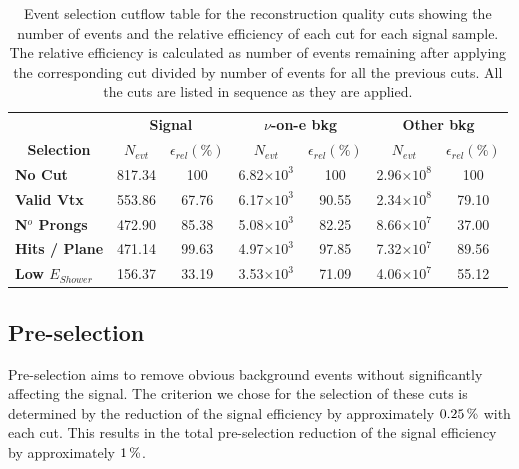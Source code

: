 \begin{table}[!hb]
\centering
\caption[Event selection cutflow table for the reconstruction quality cuts]{Event selection cutflow table for the reconstruction quality cuts showing the number of events and the relative efficiency of each cut for each signal sample. The relative efficiency is calculated as number of events remaining after applying the corresponding cut divided by number of events for all the previous cuts. All the cuts are listed in sequence as they are applied.}
\begin{tabular}{|l|cc|cc|cc|}\hline
\multicolumn{1}{|c|}{} & \multicolumn{2}{c|}{\textbf{Signal}} & \multicolumn{2}{c|}{\textbf{$\nu$-on-e bkg}} & \multicolumn{2}{c|}{\textbf{Other bkg}} \\
\multicolumn{1}{|c|}{\multirow{-2}{*}{\textbf{Selection}}} & \textbf{$N_{evt}$} & \textbf{$\epsilon_{rel}\left(\%\right)$} & \textbf{$N_{evt}$} & \textbf{$\epsilon_{rel}\left(\%\right)$}  & \textbf{$N_{evt}$} & \textbf{$\epsilon_{rel}\left(\%\right)$}\\\hline
\textbf{No Cut} & 817.34 & 100 & 6.82$\times 10^3$ & 100 & 2.96$\times 10^8$ & 100\\
\textbf{Valid Vtx} & 553.86 & 67.76 & 6.17$\times 10^3$ & 90.55 & 2.34$\times 10^8$ & 79.10\\
\textbf{N$^o$ Prongs} & 472.90 & 85.38 & 5.08$\times 10^3$ & 82.25 & 8.66$\times 10^7$ & 37.00\\
\textbf{Hits / Plane} & 471.14 & 99.63 & 4.97$\times 10^3$ & 97.85 & 7.32$\times 10^7$ & 89.56\\
\textbf{Low $E_{Shower}$} & 156.37 & 33.19 & 3.53$\times 10^3$ & 71.09 & 4.06$\times 10^7$ & 55.12\\\hline
\end{tabular}
\label{tab:CutflowTableBasicRecoQC}
\end{table}

\subsection{Pre-selection}\label{sec:NuMMEventSelectionPresel}
Pre-selection aims to remove obvious background events without significantly affecting the signal. The criterion we chose for the selection of these cuts is determined by the reduction of the signal efficiency by approximately $\unit[0.25]{\%}$ with each cut. This results in the total pre-selection reduction of the signal efficiency by approximately $\unit[1]{\%}$.

